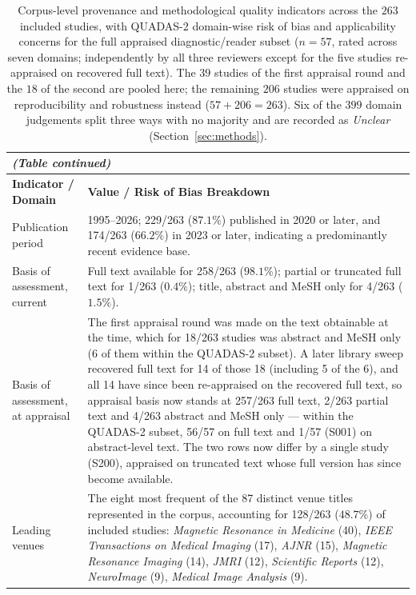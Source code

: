 \documentclass[review,authoryear]{elsarticle}
\begin{document}
{\def\baselinestretch{1}\footnotesize
\setlength{\tabcolsep}{5pt}
\renewcommand{\arraystretch}{1.15}
\begin{longtable}{p{} p{}}
\caption{Corpus-level provenance and methodological quality indicators across the
$263$ included studies, with QUADAS-2 domain-wise risk of bias and applicability
concerns for the full appraised diagnostic/reader subset ($n=57$, rated across seven
domains; independently by all three reviewers except for the five studies re-appraised
on recovered full text). The $39$ studies of the
first appraisal round and the $18$ of the second are pooled here; the remaining
$206$ studies were appraised on reproducibility and robustness instead
($57+206=263$). Six of the $399$ domain judgements split three ways with no majority and
are recorded as \emph{Unclear} (Section~\ref{sec:methods}).}\label{tab:quality_appraisal}\\
\endfirsthead
\multicolumn{2}{l}{\footnotesize\emph{(Table \thetable{} continued)}}\\
\endhead
\hline
\textbf{Indicator / Domain} & \textbf{Value / Risk of Bias Breakdown} \\
\hline
Publication period & 1995--2026; 229/263 ($87.1\%$) published in 2020 or later, and 174/263 ($66.2\%$) in 2023 or later, indicating a predominantly recent evidence base. \\
Basis of assessment, current & Full text available for 258/263 ($98.1\%$); partial or truncated full text for 1/263 ($0.4\%$); title, abstract and MeSH only for 4/263 ($1.5\%$). \\
Basis of assessment, at appraisal & The first appraisal round was made on the text obtainable at the time, which for 18/263 studies was abstract and MeSH only (6 of them within the QUADAS-2 subset). A later library sweep recovered full text for 14 of those 18 (including 5 of the 6), and all 14 have since been re-appraised on the recovered full text, so appraisal basis now stands at 257/263 full text, 2/263 partial text and 4/263 abstract and MeSH only --- within the QUADAS-2 subset, 56/57 on full text and 1/57 (S001) on abstract-level text. The two rows now differ by a single study (S200), appraised on truncated text whose full version has since become available. \\
Leading venues & The eight most frequent of the 87 distinct venue titles represented in the corpus, accounting for 128/263 ($48.7\%$) of included studies: \emph{Magnetic Resonance in Medicine} (40), \emph{IEEE Transactions on Medical Imaging} (17), \emph{AJNR} (15), \emph{Magnetic Resonance Imaging} (14), \emph{JMRI} (12), \emph{Scientific Reports} (12), \emph{NeuroImage} (9), \emph{Medical Image Analysis} (9). \\

\end{longtable}}
\end{document}
